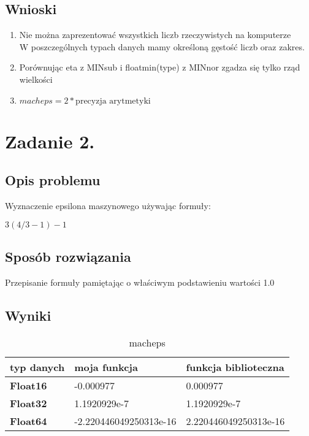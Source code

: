 \documentclass[12pt]{article}
\begin{document}
\subsection{Wnioski}
\begin{enumerate}
    \item Nie można zaprezentować wszystkich liczb rzeczywistych na komputerze\\
    W poszczególnych typach danych mamy określoną gęstość liczb oraz zakres.
    \item Porównując eta z MINsub i floatmin(type) z MINnor zgadza się tylko rząd wielkości
    \item $macheps = 2* \text{precyzja arytmetyki}$
\end{enumerate}
\section{Zadanie 2.}

\subsection{Opis problemu}

Wyznaczenie epsilona maszynowego używając formuły:\\\centerline{$3(4/3-1)-1$}

\subsection{Sposób rozwiązania}
Przepisanie formuły pamiętając o właściwym podstawieniu wartości 1.0
\subsection{Wyniki}
\begin{table}[h]
    \caption{macheps}
    \label{macheps}
    \begin{tabular}{|l|l|l|}
        \hline 
        \textbf{typ danych} & \textbf{moja funkcja} & \textbf{funkcja biblioteczna}\\
        \hline
        \textbf{Float16} & -0.000977 & 0.000977\\
        \hline
        \textbf{Float32} & 1.1920929e-7  & 1.1920929e-7\\
        \hline
        \textbf{Float64} & -2.220446049250313e-16 & 2.220446049250313e-16 \\
        \hline
    \end{tabular} 
\end{table}
\end{document}
